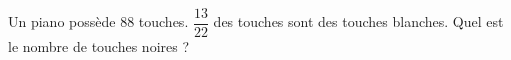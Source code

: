 \documentclass[exercice]{thedocument}%
\begin{document}
%
Un piano possède 88 touches. $\dfrac{13}{22}$ des touches sont des touches
blanches.\vskip10pt Quel est le nombre de touches noires ?
\end{document}
